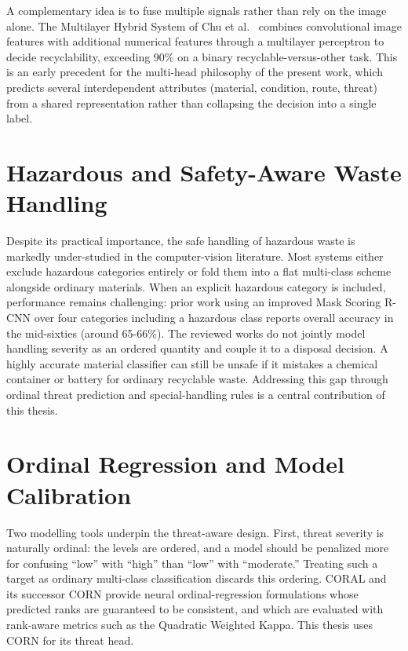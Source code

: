 A complementary idea is to fuse multiple signals rather than rely on the image alone. The Multilayer Hybrid System of Chu et al.\ \cite{mhs} combines convolutional image features with additional numerical features through a multilayer perceptron to decide recyclability, exceeding 90\% on a binary recyclable-versus-other task. This is an early precedent for the multi-head philosophy of the present work, which predicts several interdependent attributes (material, condition, route, threat) from a shared representation rather than collapsing the decision into a single label.

\section{Hazardous and Safety-Aware Waste Handling}
Despite its practical importance, the safe handling of hazardous waste is markedly under-studied in the computer-vision literature. Most systems either exclude hazardous categories entirely or fold them into a flat multi-class scheme alongside ordinary materials. When an explicit hazardous category is included, performance remains challenging: prior work using an improved Mask Scoring R-CNN \cite{maskscoringwaste} over four categories including a hazardous class reports overall accuracy in the mid-sixties (around 65-66\%). The reviewed works do not jointly model handling severity as an ordered quantity and couple it to a disposal decision. A highly accurate material classifier can still be unsafe if it mistakes a chemical container or battery for ordinary recyclable waste. Addressing this gap through ordinal threat prediction and special-handling rules is a central contribution of this thesis.

\section{Ordinal Regression and Model Calibration}
Two modelling tools underpin the threat-aware design. First, threat severity is naturally ordinal: the levels are ordered, and a model should be penalized more for confusing ``low'' with ``high'' than ``low'' with ``moderate.'' Treating such a target as ordinary multi-class classification discards this ordering. CORAL \cite{coral} and its successor CORN \cite{corn} provide neural ordinal-regression formulations whose predicted ranks are guaranteed to be consistent, and which are evaluated with rank-aware metrics such as the Quadratic Weighted Kappa. This thesis uses CORN for its threat head.

